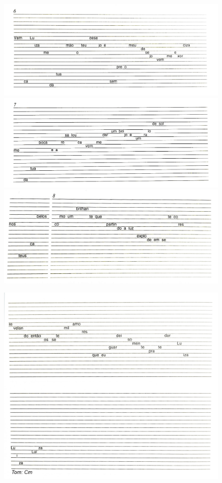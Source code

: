 \begin{figure}[H]
\includegraphics[width=\textwidth]{./imgs/figura18.jpg}

\includegraphics[width=\textwidth]{./imgs/figura19.jpg}

\includegraphics[width=\textwidth]{./imgs/figura20.jpg}
\end{figure}

\begin{figure}[H]
\includegraphics[width=\textwidth]{./imgs/figura21.jpg}
\end{figure}

